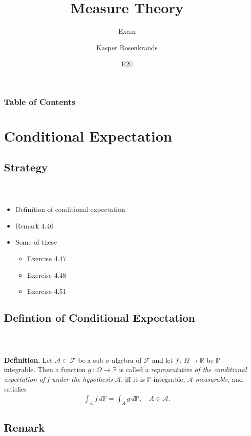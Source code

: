 \documentclass{beamer}
\title{Measure Theory}
\subtitle{Exam}
\author{Kasper Rosenkrands}
\institute{Aalborg University}
\date{E20}
\numberwithin{equation}{section}
\newenvironment{frame2}{\begin{frame}\frametitle{{\normalsize \secname} \\ {\large \subsecname}}}{\end{frame}}
\begin{document}
\frame{\titlepage}

\begin{frame}
\frametitle{Table of Contents}
\tableofcontents[hideallsubsections]
\end{frame}

\section{Conditional Expectation}

\subsection{Strategy}
\begin{frame2}
    \begin{itemize}
        \item Definition of conditional expectation
        \item Remark 4.46
        \item Some of these
        \begin{itemize}
            \item Exercise 4.47
            \item Exercise 4.48
            \item Exercise 4.51
        \end{itemize}
    \end{itemize}
\end{frame2}

\subsection{Defintion of Conditional Expectation}

\begin{frame2}
    \textbf{Definition.}
    Let $\mathcal{A} \subset \mathcal{F}$ be a sub-$\sigma$-algebra of $\mathcal{F}$ and let $f \, : \, \Omega \rightarrow \mathbb{R}$ be $\mathbb{P}$-integrable.
    Then a function $g \, : \, \Omega \rightarrow \mathbb{R}$ is called a \textit{representative of the conditional expectation of f under the hypothesis} $\mathcal{A}$, iff it is $\mathbb{P}$-integrable, $\mathcal{A}$-\textit{measurable}, and satisfies
    \begin{align}\label{eq:4.15}
        \int_Af\, d\mathbb{P} = \int_Ag\, d\mathbb{P}, \quad A \in \mathcal{A}.
    \end{align}
\end{frame2}

\subsection{Remark}
\end{document}
